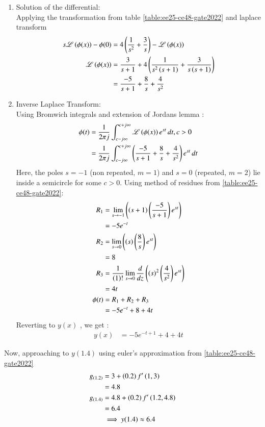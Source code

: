 \documentclass[journal,12pt,onecolumn]{IEEEtran}
\theoremstyle{remark}
\begin{document}
\begin{enumerate}
    \item Solution of the differential:\\
 Applying the transformation from table \ref{table:ee25-ce48-gate2022} and laplace transform 
    \begin{align}
             s\mathscr{L}\left(\phi(x)\right) - \phi(0) &= 4\left(\frac{1}{s^2}+\frac{3}{s}\right)-\mathscr{L}\left(\phi(x)\right)\\
             \mathscr{L}\left(\phi(x)\right) &= \frac{3}{s+1} + 4\left(\frac{1}{s^2\left(s+1\right)}+\frac{3}{s\left(s+1\right)}\right)\\
             &=\frac{-5}{s+1} + \frac{8}{s} + \frac{4}{s^2}
    \end{align}
\item  Inverse Laplace Transform:\\
Using Bromwich integrals and extension of Jordans lemma :
\begin{align}
    \phi(t) &= \frac{1}{2\pi j}\int_{c-j\infty}^{c+j\infty}\mathscr{L}\left(\phi(x)\right)e^{st}\,dt , c > 0\\
     &= \frac{1}{2\pi j}\int_{c-j\infty}^{c+j\infty}\left(\frac{-5}{s+1} + \frac{8}{s} + \frac{4}{s^2}\right)e^{st}\,dt
\end{align}
Here, the poles $s=-1$ (non repeated, $m=1$) and $s=0$ (repeated, $m=2$) lie inside a semicircle for some $c>0$. Using method of residues from \ref{table:ee25-ce48-gate2022}:
\begin{align}
    R_1 &= \lim\limits_{s\to -1}\left({\left(s+1\right)}\left(\frac{-5}{s+1}\right)e^{st}\right) \\
    &= -5e^{-t}\\
   R_2 &= \lim\limits_{s\to 0}\left({\left(s\right)}\left(\frac{8}{s}\right)e^{st}\right)\\
   &= 8\\
 R_3&=\frac{1}{\left(1\right)!}\lim\limits_{s\to 0}\frac{d}{dz}\left({(s)}^{2}\left(\frac{4}{s^2}\right)e^{st}\right)\\
 &=4t\\
\phi(t) &= R_1 + R_2 + R_3\\
&= -5e^{-t} + 8 + 4t
\end{align}
Reverting to $y(x)$ , we get :
\begin{align}
    y(x) &= -5e^{-t+1} + 4 + 4t
\end{align}
\end{enumerate}
Now, approaching to $y(1.4)$ using euler's approximation from \ref{table:ee25-ce48-gate2022}
\begin{align}
    g_{\left(1.2\right)} &= 3 + \left(0.2\right)f'\left(1,3\right)\\
    &=4.8\\
    g_{\left(1.4\right)} &= 4.8 +\left(0.2\right)f'\left(1.2,4.8\right)\\
    &= 6.4\\
    &\implies y(1.4) \approx 6.4 
\end{align}
\end{document}
